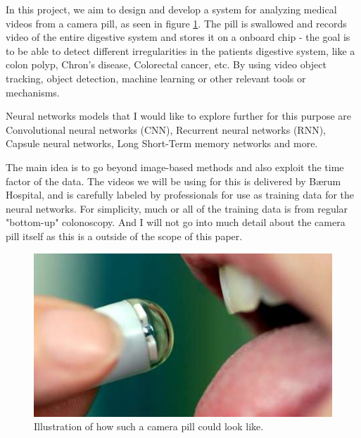\documentclass[english, a4paper]{report}
\begin{document}
In this project, we aim to design and develop a system for analyzing medical videos from a camera pill, as seen in figure \ref{fig:pill-cam}. The pill is swallowed and records video of the entire digestive system and stores it on a onboard chip - the goal is to be able to detect different irregularities in the patients digestive system, like a colon polyp, Chron's disease, Colorectal cancer, etc. By using video object tracking, object detection, machine learning or other relevant tools or mechanisms.

Neural networks models that I would like to explore further for this purpose are Convolutional neural networks (CNN), Recurrent neural networks (RNN), Capsule neural networks, Long Short-Term memory networks and more.

The main idea is to go beyond image-based methods and also exploit the time factor of the data. 
The videos we will be using for this is delivered by Bærum Hospital, and is carefully labeled by professionals for use as training data for the neural networks. For simplicity, much or all of the training data is from regular "bottom-up" colonoscopy. And I will not go into much detail about the camera pill itself as this is a outside of the scope of this paper.

\begin{figure}[H]
\begin{center}
 \includegraphics[width=\textwidth]{pill-cam.jpg}
 \caption{Illustration of how such a camera pill could look like. \cite{PillCamCamera}}
 \label{fig:pill-cam}
 \end{center}
\end{figure}
\end{document}
